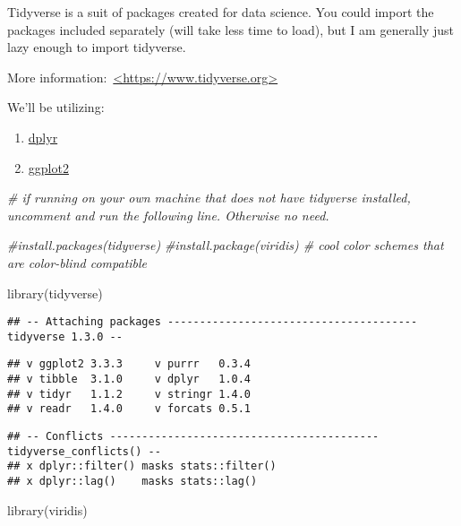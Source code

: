 \documentclass[
]{article}
\newenvironment{Shaded}{\begin{snugshade}}{\end{snugshade}}
\newcommand{\CommentTok}[1]{\textcolor[rgb]{0.56,0.35,0.01}{\textit{#1}}}
\newcommand{\FunctionTok}[1]{\textcolor[rgb]{0.00,0.00,0.00}{#1}}
\newcommand{\NormalTok}[1]{#1}
\begin{document}
Tidyverse is a suit of packages created for data science. You could
import the packages included separately (will take less time to load),
but I am generally just lazy enough to import tidyverse.~

More
information:~\href{https://www.tidyverse.org/}{\textless https://www.tidyverse.org\textgreater{}}

We'll be utilizing:

\begin{enumerate}
\def\labelenumi{\arabic{enumi}.}
\item
  \href{https://dplyr.tidyverse.org/}{dplyr}
\item
  \href{https://ggplot2.tidyverse.org/}{ggplot2}
\end{enumerate}

\begin{Shaded}
\begin{Highlighting}[]
\CommentTok{\# if running on your own machine that does not have tidyverse installed, uncomment and run the following line. Otherwise no need.}

\CommentTok{\#install.packages(\textquotesingle{}tidyverse\textquotesingle{})}
\CommentTok{\#install.package(\textquotesingle{}viridis\textquotesingle{})         \# cool color schemes that are color{-}blind compatible}

\FunctionTok{library}\NormalTok{(tidyverse)}
\end{Highlighting}
\end{Shaded}

\begin{verbatim}
## -- Attaching packages --------------------------------------- tidyverse 1.3.0 --
\end{verbatim}

\begin{verbatim}
## v ggplot2 3.3.3     v purrr   0.3.4
## v tibble  3.1.0     v dplyr   1.0.4
## v tidyr   1.1.2     v stringr 1.4.0
## v readr   1.4.0     v forcats 0.5.1
\end{verbatim}

\begin{verbatim}
## -- Conflicts ------------------------------------------ tidyverse_conflicts() --
## x dplyr::filter() masks stats::filter()
## x dplyr::lag()    masks stats::lag()
\end{verbatim}

\begin{Shaded}
\begin{Highlighting}[]
\FunctionTok{library}\NormalTok{(viridis)}
\end{Highlighting}
\end{Shaded}
\end{document}
